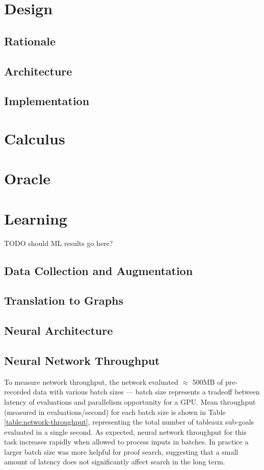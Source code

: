 \documentclass[runningheads]{llncs}
\begin{document}
\section{Design}
\subsection{Rationale}
\subsection{Architecture}
\subsection{Implementation}

\section{Calculus}
\section{Oracle}

\section{Learning}
TODO should ML results go here?

\subsection{Data Collection and Augmentation}
\subsection{Translation to Graphs}
\subsection{Neural Architecture}

\subsection{Neural Network Throughput}
To measure network throughput, the network evaluated \(\approx\) 500MB of pre-recorded data with various batch sizes --- batch size represents a tradeoff between latency of evaluations and parallelism opportunity for a GPU.
Mean throughput (measured in evaluations/second) for each batch size is shown in Table \ref{table:network-throughput}, representing the total number of tableaux sub-goals evaluated in a single second.
As expected, neural network throughput for this task increases rapidly when allowed to process inputs in batches.
In practice a larger batch size was more helpful for proof search, suggesting that a small amount of latency does not significantly affect search in the long term.
\end{document}
